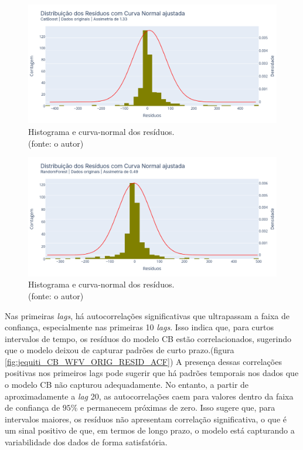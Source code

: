 \begin{figure}[!h]
\centering
\includegraphics[scale=0.33]{Figuras/jequiti/resultados/CB_WFV_ORIG_RESID_x_CURVA_NORMAL.png}
\caption{Histograma e curva-normal dos resíduos.\\(fonte: o autor)}
\label{fig:jequiti_CB_WFV_ORIG_RESID_x_CURVA_NORMAL}
\end{figure}

\begin{figure}[!h]
\centering
\includegraphics[scale=0.33]{Figuras/jequiti/resultados/RF_WFV_ORIG_RESID_x_CURVA_NORMAL.png}
\caption{Histograma e curva-normal dos resíduos.\\(fonte: o autor)}
\label{fig:jequiti_RF_WFV_ORIG_RESID_x_CURVA_NORMAL}
\end{figure}
\clearpage

Nas primeiras \textit{lags}, há autocorrelações significativas que ultrapassam a faixa de confiança, especialmente nas primeiras 10 \textit{lags}. Isso indica que, para curtos intervalos de tempo, os resíduos do modelo CB estão correlacionados, sugerindo que o modelo deixou de capturar padrões de curto prazo.(figura \ref{fig:jequiti_CB_WFV_ORIG_RESID_ACF}) A presença dessas correlações positivas nos primeiros lags pode sugerir que há padrões temporais nos dados que o modelo CB não capturou adequadamente. No entanto, a partir de aproximadamente a \textit{lag} 20, as autocorrelações caem para valores dentro da faixa de confiança de $95\%$ e permanecem próximas de zero. Isso sugere que, para intervalos maiores, os resíduos não apresentam correlação significativa, o que é um sinal positivo de que, em termos de longo prazo, o modelo está capturando a variabilidade dos dados de forma satisfatória.


